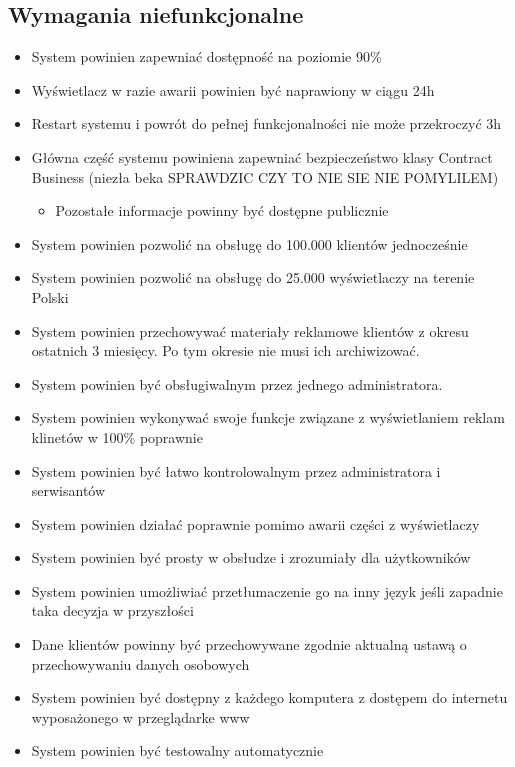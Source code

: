 \documentclass[10pt,a4paper,titlepage]{article} %
\begin{document}
		\subsection{Wymagania niefunkcjonalne}
		   \begin{itemize}
		     \item System powinien zapewniać dostępność na poziomie 90\%
		     \item Wyświetlacz w razie awarii powinien być naprawiony w ciągu 24h
		     \item Restart systemu i powrót do pełnej funkcjonalności nie może
		     przekroczyć 3h
		     \item Główna część systemu powiniena zapewniać bezpieczeństwo klasy
		     Contract Business (niezła beka SPRAWDZIC CZY TO NIE SIE NIE POMYLILEM)
		     \begin{itemize}
		      \item Pozostałe informacje powinny być dostępne publicznie
		     \end{itemize}
		     \item System powinien pozwolić na obsługę do 100.000 klientów
		     jednocześnie
		     \item System powinien pozwolić na obsługę do 25.000 wyświetlaczy na
		     terenie Polski
		     \item System powinien przechowywać materiały reklamowe klientów z okresu
		     ostatnich 3 miesięcy. Po tym okresie nie musi ich archiwizować.
		     \item System powinien być obsługiwalnym przez jednego administratora.
		     \item System powinien wykonywać swoje funkcje związane z wyświetlaniem
		     reklam klinetów w 100\% poprawnie
		     \item System powinien być łatwo kontrolowalnym przez administratora i
		     serwisantów
		     \item System powinien działać poprawnie pomimo awarii części z
		     wyświetlaczy
		     \item System powinien być prosty w obsłudze i zrozumiały dla użytkowników
		     \item System powinien umożliwiać przetłumaczenie go na inny język jeśli
		     zapadnie taka decyzja w przyszłości
		     \item Dane klientów powinny być przechowywane zgodnie aktualną ustawą o
		     przechowywaniu danych osobowych
		     \item System powinien być dostępny z każdego komputera z dostępem do
		     internetu wyposażonego w przeglądarke www
		     \item System powinien być testowalny automatycznie
		   \end{itemize}
	
\end{document}
